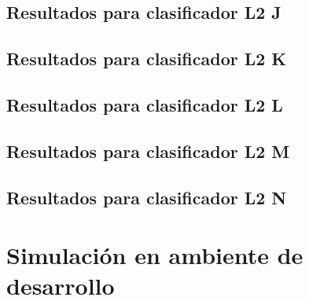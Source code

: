 \subsection{Resultados para clasificador L2 J}

\subsection{Resultados para clasificador L2 K}

\subsection{Resultados para clasificador L2 L}

\subsection{Resultados para clasificador L2 M}

\subsection{Resultados para clasificador L2 N}

\section{Simulación en ambiente de desarrollo}


